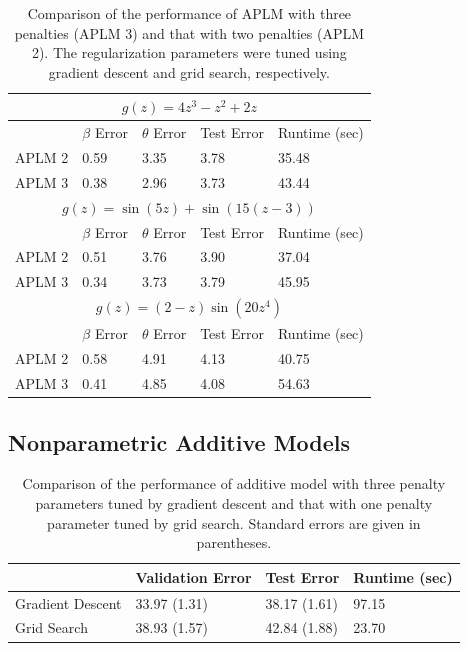 \documentclass{statsoc}
\begin{document}
\begin{table}
\caption{\label{ref:aplm} Comparison of the performance of APLM with three penalties (APLM 3) and that with two penalties (APLM 2). The regularization parameters were tuned using gradient descent and grid search, respectively.}
\centering
\begin{tabular}{| l | l | l | l | l | }
\hline
\multicolumn{5}{|c|}{$g(z) = 4z^3 - z^2 + 2z$}\\
\hline
 & $\beta$ Error & $\theta$ Error & Test Error & Runtime (sec) \\
\hline
APLM 2 & 0.59 & 3.35 & 3.78 & 35.48 \\
\hline
APLM 3 & 0.38 & 2.96 & 3.73 & 43.44 \\
\hline
\multicolumn{5}{|c|}{$g(z) = \sin(5z) + \sin(15(z - 3))$}\\
\hline
 & $\beta$ Error & $\theta$ Error & Test Error & Runtime (sec) \\
\hline
APLM 2 & 0.51 & 3.76 & 3.90 & 37.04 \\
\hline
APLM 3 & 0.34 & 3.73 & 3.79 & 45.95 \\
\hline
\multicolumn{5}{|c|}{$g(z) = (2-z)\sin(20z^4)$}\\
\hline
 & $\beta$ Error & $\theta$ Error & Test Error & Runtime (sec) \\
\hline
APLM 2 & 0.58 & 4.91 & 4.13 & 40.75 \\
\hline
APLM 3 & 0.41 & 4.85 & 4.08 & 54.63 \\
\hline
\end{tabular}
\end{table}

\subsection{Nonparametric Additive Models}

\begin{table}
\caption {\label{tab:additive} Comparison of the performance of additive model with three penalty parameters tuned by gradient descent and that with one penalty parameter tuned by grid search. Standard errors are given in parentheses.}
\centering
\begin{tabular}{| l | l | l | l | }
\hline
& Validation Error & Test Error & Runtime (sec) \\
\hline
Gradient Descent & 33.97 (1.31) & 38.17 (1.61) & 97.15 \\
\hline
Grid Search & 38.93 (1.57) & 42.84 (1.88) & 23.70 \\
\hline
\end{tabular}
\end{table}
\end{document}
